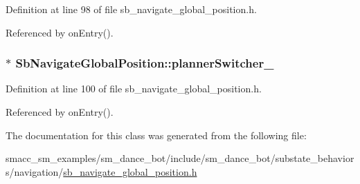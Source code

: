 Definition at line 98 of file sb\+\_\+navigate\+\_\+global\+\_\+position.\+h.



Referenced by on\+Entry().

\subsubsection[{\texorpdfstring{planner\+Switcher\+\_\+}{plannerSwitcher_}}]{$\ast$ Sb\+Navigate\+Global\+Position\+::planner\+Switcher\+\_\+\hspace{0.3cm}{\ttfamily [private]}}\hypertarget{classSbNavigateGlobalPosition_a27d990af827d8d99779285641110b9d1}{}\label{classSbNavigateGlobalPosition_a27d990af827d8d99779285641110b9d1}


Definition at line 100 of file sb\+\_\+navigate\+\_\+global\+\_\+position.\+h.



Referenced by on\+Entry().



The documentation for this class was generated from the following file\+:\begin{DoxyCompactItemize}
\item 
smacc\+\_\+sm\+\_\+examples/sm\+\_\+dance\+\_\+bot/include/sm\+\_\+dance\+\_\+bot/substate\+\_\+behaviors/navigation/\hyperlink{sb__navigate__global__position_8h}{sb\+\_\+navigate\+\_\+global\+\_\+position.\+h}\end{DoxyCompactItemize}
